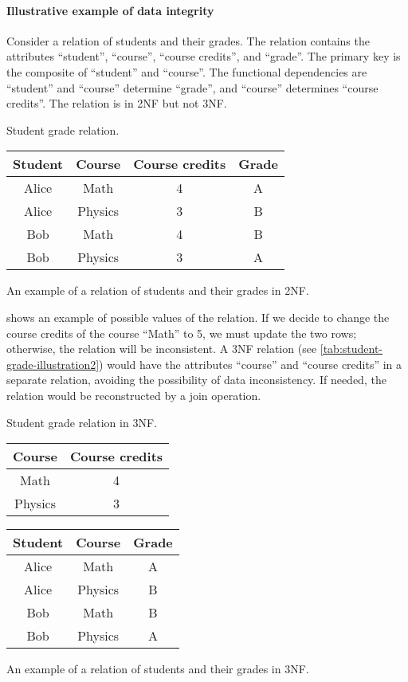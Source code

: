 \paragraph{Illustrative example of data integrity}  Consider a relation of students and
their grades.  The relation contains the attributes ``student'', ``course'', ``course
credits'', and ``grade''.  The primary key is the composite of ``student'' and ``course''.
The functional dependencies are ``student'' and ``course'' determine ``grade'', and
``course'' determines ``course credits''.  The relation is in 2NF but not 3NF.

\begin{tablebox}[label=tab:student-grade-illustration]{Student grade relation.}
  \centering
  \begin{tabular}{cccc}
    \toprule
    \textbf{Student} & \textbf{Course} & \textbf{Course credits} & \textbf{Grade} \\
    \midrule
    Alice & Math & 4 & A \\
    Alice & Physics & 3 & B \\
    Bob & Math & 4 & B \\
    Bob & Physics & 3 & A \\
    \bottomrule
  \end{tabular}
  \tcblower
  An example of a relation of students and their grades in 2NF.
\end{tablebox}

 shows an example of possible values of the relation.
If we decide to change the course credits of the course ``Math'' to 5, we must update the
two rows; otherwise, the relation will be inconsistent.  A 3NF relation (see
\cref{tab:student-grade-illustration2}) would have the attributes ``course'' and ``course
credits'' in a separate relation, avoiding the possibility of data inconsistency.  If
needed, the relation would be reconstructed by a join operation.

\begin{tablebox}[label=tab:student-grade-illustration2]{Student grade relation in 3NF.}
  \centering
  \begin{tabular}{cc}
    \toprule
    \textbf{Course} & \textbf{Course credits} \\
    \midrule
    Math & 4 \\
    Physics & 3 \\
    \bottomrule
  \end{tabular}
  \quad
  \begin{tabular}{ccc}
    \toprule
    \textbf{Student} & \textbf{Course} & \textbf{Grade} \\
    \midrule
    Alice & Math & A \\
    Alice & Physics & B \\
    Bob & Math & B \\
    Bob & Physics & A \\
    \bottomrule
  \end{tabular}
  \tcblower
  An example of a relation of students and their grades in 3NF.
\end{tablebox}

